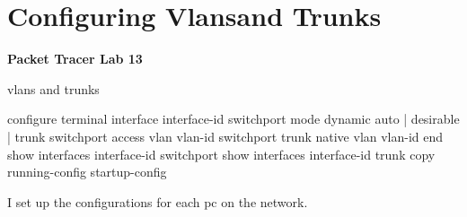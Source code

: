 \documentclass[../EngineeringJournal_CDavis.tex]{subfiles}
\begin{document}

\chapter[Configuring Vlans and Trunks]{Configuring Vlans\linebreak[1] and
Trunks \hspace*{\fill March 4, 2020}}
\noindent\textbf{{Packet Tracer Lab 13} }                             


\hspace{0.2cm}
\begin{tcolorbox}[width=6.3in]
\scriptsize 
vlans and trunks
  \begin{outline}
    \1 configure terminal
    \1 interface interface-id
    \1 switchport mode {dynamic {auto | desirable} | trunk}
    \1 switchport access vlan vlan-id
    \1 switchport trunk native vlan vlan-id end
    \1 show interfaces interface-id switchport
    \1 show interfaces interface-id trunk
    \1 copy running-config startup-config
  \end{outline}
\end{tcolorbox}
\hspace{0.2cm}
\normalsize  
  
\clearpage


I set up the configurations for each pc on the network. 
\end{document}
